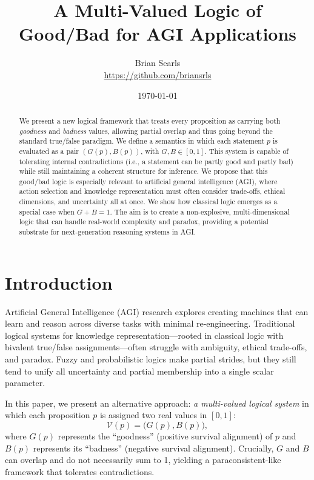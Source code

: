 \documentclass[11pt]{article}
\title{A Multi-Valued Logic of Good/Bad for AGI Applications}
\author{Brian Searls\\\href{https://github.com/briansrls}{https://github.com/briansrls}}
\date{\today}
\begin{document}
\maketitle

\begin{abstract}
We present a new logical framework that treats every proposition as carrying both 
\emph{goodness} and \emph{badness} values, allowing partial overlap and thus going 
beyond the standard true/false paradigm. We define a semantics in which each statement
\(p\) is evaluated as a pair \((G(p), B(p))\), with \(G, B \in [0,1]\). This system 
is capable of tolerating internal contradictions (i.e., a statement can be partly 
good and partly bad) while still maintaining a coherent structure for inference. We 
propose that this good/bad logic is especially relevant to artificial general intelligence (AGI), 
where action selection and knowledge representation must often consider trade-offs, 
ethical dimensions, and uncertainty all at once. We show how classical logic emerges 
as a special case when \(G + B = 1\). The aim is to create a non-explosive, 
multi-dimensional logic that can handle real-world complexity and paradox, providing a 
potential substrate for next-generation reasoning systems in AGI.
\end{abstract}

\section{Introduction}

Artificial General Intelligence (AGI) research explores creating machines that can learn 
and reason across diverse tasks with minimal re-engineering. Traditional logical systems 
for knowledge representation---rooted in classical logic with bivalent true/false 
assignments---often struggle with ambiguity, ethical trade-offs, and paradox. 
Fuzzy and probabilistic logics make partial strides, but they still tend to unify all 
uncertainty and partial membership into a single scalar parameter.

In this paper, we present an alternative approach: \emph{a multi-valued logical system} in which 
each proposition \(p\) is assigned two real values in \([0,1]\):
\[
   \mathcal{V}(p) = \bigl(G(p), B(p)\bigr),
\]
where \(G(p)\) represents the ``goodness'' (positive survival alignment) of \(p\) 
and \(B(p)\) represents its ``badness'' (negative survival alignment).
Crucially, \(G\) and \(B\) can overlap and do not necessarily sum to 1, 
yielding a paraconsistent-like framework that tolerates contradictions. 
\end{document}
